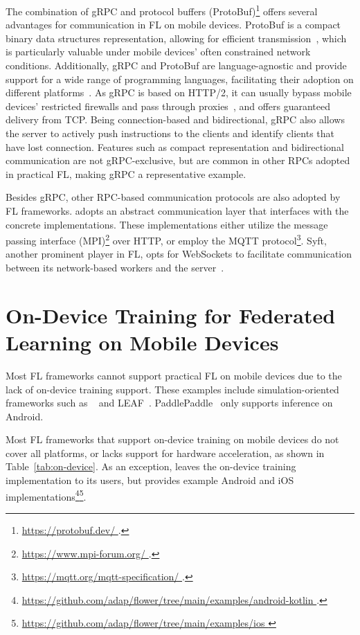 \documentclass[conference]{IEEEtran}
\begin{document}
The combination of gRPC and protocol buffers (ProtoBuf)\footnote{\url{
    https://protobuf.dev/
}.} offers several advantages for communication in FL on mobile devices.
ProtoBuf is a compact binary data structures representation,
allowing for efficient transmission~\cite{popic2016performance},
which is particularly valuable under mobile devices'
often constrained network conditions.
Additionally,
gRPC and ProtoBuf are language-agnostic and
provide support for a wide range of programming languages,
facilitating their adoption on different platforms~\cite{araujo2020performance}.
As gRPC is based on HTTP/2,
it can usually bypass mobile devices' restricted firewalls and
pass through proxies~\cite{araujo2020performance},
and offers guaranteed delivery from TCP.
Being connection-based and bidirectional,
gRPC also allows the server to actively push instructions to the clients and
identify clients that have lost connection.
Features such as compact representation and bidirectional communication are
not gRPC-exclusive,
but are common in other RPCs adopted in practical FL,
making gRPC a representative example.

Besides gRPC, other RPC-based communication protocols are
also adopted by FL frameworks.
\FedML{} adopts an abstract communication layer that interfaces with
the concrete implementations.
These implementations either utilize the message passing interface
(MPI)\footnote{\url{
    https://www.mpi-forum.org/
}.} over HTTP,
or employ the MQTT protocol\footnote{\url{
    https://mqtt.org/mqtt-specification/
}.}.
Syft, another prominent player in FL,
opts for WebSockets to facilitate communication between
its network-based workers and the server~\cite{Ziller2021}.

\section{On-Device Training for Federated Learning on Mobile Devices}

\label{sec:on-device}

Most FL frameworks cannot support practical FL on mobile devices due to
the lack of on-device training support.
These examples include simulation-oriented frameworks such as
\TFF{}~\cite{kholod2020open} and
LEAF~\cite{caldas2018leaf}.
PaddlePaddle~\cite{ma2019paddlepaddle}
only supports inference on Android.

Most FL frameworks that support on-device training on mobile devices do not
cover all platforms,
or lacks support for hardware acceleration,
as shown in Table~\ref{tab:on-device}.
As an exception,
\Flower{} leaves the on-device training implementation to
its users,
but provides example Android and iOS implementations\footnote{\url{
    https://github.com/adap/flower/tree/main/examples/android-kotlin
}.}\footnote{\url{
    https://github.com/adap/flower/tree/main/examples/ios
}}.
\end{document}
